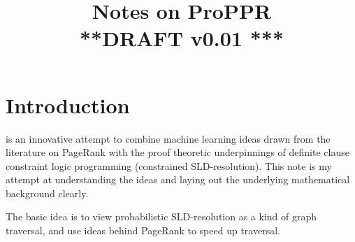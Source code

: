 \documentclass{article} %
\newcommand{\keywords}[1]{\par\addvspace\baselineskip
\noindent\keywordname\enspace\ignorespaces#1}
\begin{document}
%

\long{}
\def\mtimes{}
\def\LL#1{#1}
\title{Notes on ProPPR \\
{\small ***DRAFT v0.01 ***}}

\author{
}

\newcommand{\fix}{\marginpar{FIX}}
\newcommand{\new}{\marginpar{NEW}}

\nipsfinalcopy %

\maketitle

\begin{abstract}

\end{abstract}

\def\Or{\vee}
\def\And{\wedge}
\def\Arrow{\rightarrow}
\def\Xor{\;\mbox{xor}\;}
\def\Ind{\;\mbox{Ind}}
\def\pr{\mbox{\em pr}}
\def\apr{\mbox{apr}}
\def\APR{\mbox{ApproxPageRank}}
\def\push{\mbox{\em push}}
\def\vol{\mbox{\em vol}}
\def\Supp{\mbox{\em Supp}}
\def\True{\mbox{\tt true}}
\def\var{\mbox{\em var}}
\def\tuple#1{\langle#1\rangle}

\section{Introduction}
\cite{Cohen-2015} is an innovative attempt to combine machine learning ideas drawn from the literature on PageRank with the proof theoretic underpinnings of definite clause constraint logic programming (constrained SLD-resolution). This note is my attempt at understanding the ideas and laying out the underlying mathematical background clearly.

The basic idea is to view probabilistic SLD-resolution as a kind of graph traversal, and use ideas behind PageRank \cite{PageRank} to speed up traversal.
\end{document}
